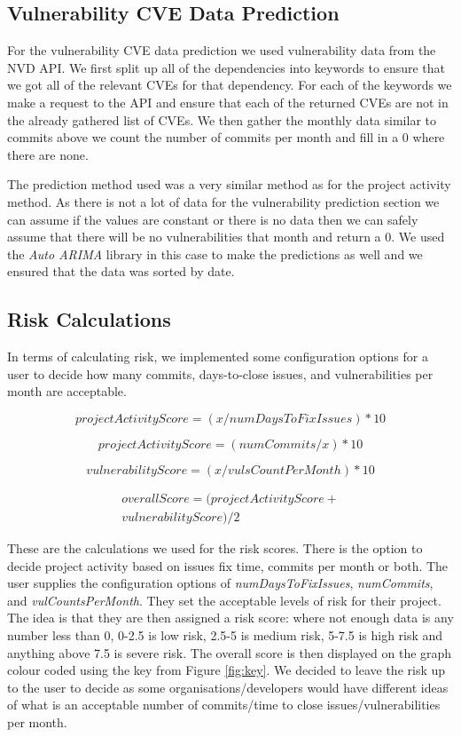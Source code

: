 \documentclass[conference]{IEEEtran}
\begin{document}
\subsection{Vulnerability CVE Data Prediction}
For the vulnerability CVE data prediction we used vulnerability data from the NVD API. We first split up all of the dependencies into keywords to ensure that we got all of the relevant CVEs for that dependency. For each of the keywords we make a request to the API and ensure that each of the returned CVEs are not in the already gathered list of CVEs. We then gather the monthly data similar to commits above we count the number of commits per month and fill in a 0 where there are none. 

The prediction method used was a very similar method as for the project activity method. As there is not a lot of data for the vulnerability prediction section we can assume if the values are constant or there is no data then we can safely assume that there will be no vulnerabilities that month and return a 0. We used the \textit{Auto ARIMA} library in this case to make the predictions as well and we ensured that the data was sorted by date. 

\subsection{Risk Calculations}
In terms of calculating risk, we implemented some configuration options for a user to decide how many commits, days-to-close issues, and vulnerabilities per month are acceptable. 

\[ projectActivityScore = ( x / numDaysToFixIssues ) * 10\]

\[ projectActivityScore = ( numCommits / x ) * 10\]

\[vulnerabilityScore = ( x / vulsCountPerMonth ) * 10\]

\begin{multline*}
  overallScore = ( projectActivityScore +\\ vulnerabilityScore) / 2 
\end{multline*}

These are the calculations we used for the risk scores. There is the option to decide project activity based on issues fix time, commits per month or both. The user supplies the configuration options of \textit{numDaysToFixIssues}, \textit{numCommits}, and \textit{vulCountsPerMonth}. They set the acceptable levels of risk for their project. The idea is that they are then assigned a risk score: where not enough data is any number less than 0, 0-2.5 is low risk, 2.5-5 is medium risk, 5-7.5 is high risk and anything above 7.5 is severe risk. The overall score is then displayed on the graph colour coded using the key from Figure \ref{fig:key}. We decided to leave the risk up to the user to decide as some organisations/developers would have different ideas of what is an acceptable number of commits/time to close issues/vulnerabilities per month. 
\end{document}
